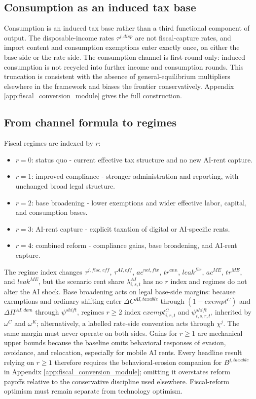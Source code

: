 \documentclass[11pt,a4paper]{article}
\begin{document}
\subsection{Consumption as an induced tax base}

Consumption is an induced tax base rather than a third functional component of output. The disposable-income rates $\tau^{j,disp}$ are not fiscal-capture rates, and import content and consumption exemptions enter exactly once, on either the base side or the rate side. The consumption channel is first-round only: induced consumption is not recycled into further income and consumption rounds. This truncation is consistent with the absence of general-equilibrium multipliers elsewhere in the framework and biases the frontier conservatively. Appendix \ref{app:fiscal_conversion_module} gives the full construction.

\subsection{From channel formula to regimes}

Fiscal regimes are indexed by $r$:
\begin{itemize}
    \item $r=0$: status quo - current effective tax structure and no new AI-rent capture.
    \item $r=1$: improved compliance - stronger administration and reporting, with unchanged broad legal structure.
    \item $r=2$: base broadening - lower exemptions and wider effective labor, capital, and consumption bases.
    \item $r=3$: AI-rent capture - explicit taxation of digital or AI-specific rents.
    \item $r=4$: combined reform - compliance gains, base broadening, and AI-rent capture.
\end{itemize}
The regime index changes $\tau^{j,fisc,eff}$, $\tau^{AI,eff}$, $ac^{net,fix}$, $tr^{ann}$, $leak^{fix}$, $ac^{ME}$, $tr^{ME}$, and $leak^{ME}$, but the scenario rent share $\lambda^{AI}_{i,s,t}$ has no $r$ index and regimes do not alter the AI shock. Base broadening acts on legal base-side margins: because exemptions and ordinary shifting enter $\Delta C^{AI,taxable}$ through $(1-exempt^C)$ and $\Delta\Pi^{AI,dom}$ through $\psi^{shift}$, regimes $r\geq2$ index $exempt^C_{i,r,t}$ and $\psi^{shift}_{i,s,r,t}$, inherited by $\omega^C$ and $\omega^K$; alternatively, a labelled rate-side convention acts through $\chi^j$. The same margin must never operate on both sides. Gains for $r\geq1$ are mechanical upper bounds because the baseline omits behavioral responses of evasion, avoidance, and relocation, especially for mobile AI rents. Every headline result relying on $r\geq1$ therefore requires the behavioral-erosion companion for $B^{j,taxable}$ in Appendix \ref{app:fiscal_conversion_module}; omitting it overstates reform payoffs relative to the conservative discipline used elsewhere. Fiscal-reform optimism must remain separate from technology optimism.
\end{document}
